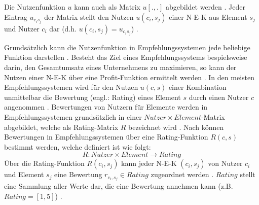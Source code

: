 Die Nutzenfunktion $u$ kann auch als Matrix $u[.,.]$ abgebildet werden \cite[S. 1]{dekhtyar:misc}.
Jeder Eintrag $u_{c_{i}s_{j}}$ der Matrix stellt den Nutzen $u(c_{i},s_{j})$ einer \ac{N-E-K} aus Element $s_{j}$ und Nutzer $c_{i}$ dar (d.h. $u(c_{i},s_{j}) = u_{c_{i}s_{j}}$) \cite[S. 1]{dekhtyar:misc}.

Grundsätzlich kann die Nutzenfunktion in Empfehlungssystemen jede beliebige Funktion darstellen \cite[S. 735]{adomavicius:inproceedings}.
Besteht das Ziel eines Empfehlungssystems bespielsweise darin, den Gesamtumsatz eines Unternehmens zu maximieren, so kann der Nutzen einer \ac{N-E-K} über eine Profit-Funktion ermittelt werden \cite[S. 735]{adomavicius:inproceedings}\cite[S. 11]{recommenderSystems:2016}\cite[S. 1]{jannach:article}\cite[S. 896]{adomavicius:article}.
In den meisten Empfehlungssystemen wird für den Nutzen $u(c,s)$ einer Kombination unmittelbar die Bewertung (engl.: Rating) eines Element $s$ durch einen Nutzer $c$ angenommen \cite[S. 735]{adomavicius:inproceedings}\cite[S. 9]{ricci:inbook}\cite[S. 11]{recommenderSystems:2016}\cite[S. 1]{dekhtyar:misc}.
Bewertungen von Nutzern für Elemente werden in Empfehlungssystemen grundsätzlich in einer $Nutzer \times Element$-Matrix abgebildet, welche als Rating-Matrix $R$ bezeichnet wird \cite[S. 87]{ekstrand:article}.
Nach \textcite[S. 48f.]{adomavicius:inproceedings:2} können Bewertungen in Empfehlungssystemen über eine Rating-Funktion $R(c,s)$ bestimmt werden, welche definiert ist wie folgt:
\begin{equation}
    R: Nutzer \times Element \rightarrow Rating
\end{equation}
Über die Rating-Funktion $R(c_{i},s_{j})$ kann jeder \ac{N-E-K} $(c_{i},s_{j})$ von Nutzer $c_{i}$ und Element $s_{j}$ eine Bewertung $r_{c_{i},s_{j}} \in Rating$ zugeordnet werden \cite[S. 42]{ning:inbook}.
$Rating$ stellt eine Sammlung aller Werte dar, die eine Bewertung annehmen kann (z.B. $Rating = [1,5]$) \cite[S. 41]{ning:inbook}.


